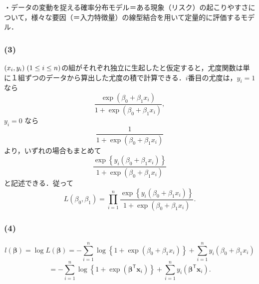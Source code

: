 \documentclass[pdflatex,ja=standard]{bxjsarticle}
\begin{document}
・データの変動を捉える確率分布モデル＝ある現象（リスク）の起こりやすさについて，様々な要因（＝入力特徴量）の線型結合を用いて定量的に評価するモデル．

\subsubsection*{(3)}
$(x_i, y_i) \hspace{1mm} (1 \leq i \leq n)$の組がそれぞれ独立に生起したと仮定すると，尤度関数は単に１組ずつのデータから算出した尤度の積で計算できる．$i$番目の尤度は，$y_i=1$なら
\begin{equation}
    \frac{\exp( \beta_0 + \beta_1 x_i )}{1 + \exp( \beta_0 + \beta_1 x_i )},
\end{equation}
$y_i=0$ なら
\begin{equation}
    \frac{1}{1 + \exp( \beta_0 + \beta_1 x_i )}
\end{equation}
より，いずれの場合もまとめて
\begin{equation}
    \frac{\exp\left\{ y_i (\beta_0 + \beta_1 x_i ) \right\}}{1 + \exp( \beta_0 + \beta_1 x_i )}
\end{equation}
と記述できる．従って
\begin{equation}
    L(\beta_0, \beta_1) = \prod_{i=1}^{n} \frac{\exp\left\{ y_i (\beta_0 + \beta_1 x_i ) \right\}}{1 + \exp( \beta_0 + \beta_1 x_i )}.
\end{equation}

\subsubsection*{(4)}
\begin{equation}
    l(\bm{\beta}) = \log L(\bm{\beta}) = - \sum_{i=1}^{n} \log \left\{ 1 +  \exp(\beta_0 + \beta_1 x_i ) \right\} + \sum_{i=1}^{n} y_i (\beta_0 + \beta_1 x_i)
\end{equation}
\begin{equation}
    = - \sum_{i=1}^{n} \log \left\{ 1 + \exp(\bm{\beta}^{\mathsf{T}} \bm{x}_i ) \right\} + \sum_{i=1}^{n} y_i (\bm{\beta}^{\mathsf{T}} \bm{x}_i ).
\end{equation}
\end{document}

